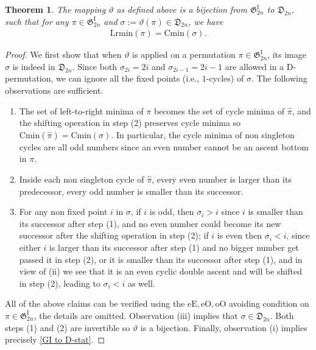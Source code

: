 \documentclass[11pt,reqno]{amsart}
\numberwithin{equation}{section}
\theoremstyle{plain}
\newtheorem{theorem}{Theorem}[section]
\theoremstyle{definition}
\newcommand{\fD}{\mathfrak{D}}
\newcommand{\fG}{\mathfrak{G}}
\newcommand{\GI}{\fG^{\mathrm{I}}}
\def\oO{\mathrm{oO}}
\def\eE{\mathrm{eE}}
\def\eO{\mathrm{eO}}
\def\Lrmin{\mathrm{Lrmin}}
\def\Cmin{\mathrm{Cmin}}
\begin{document}
\begin{theorem}\label{linyanbijection}
	The mapping $\vartheta$ as defined above is a bijection from $\GI_{2n}$ to $\fD_{2n}$, such that for any $\pi\in\GI_{2n}$ and $\sigma:=\vartheta(\pi)\in\fD_{2n}$, we have
	\begin{align}\label{GI to D-stat}
	\Lrmin(\pi) = \Cmin(\sigma).
	\end{align}  
\end{theorem}
\begin{proof}
We first show that when $\vartheta$ is applied on a permutation $\pi\in\GI_{2n}$, its image $\sigma$ is indeed in $\fD_{2n}$. Since both $\sigma_{2i}=2i$ and $\sigma_{2i-1}=2i-1$ are allowed in a D-permutation, we can ignore all the fixed points (i.e., $1$-cycles) of $\sigma$. The following observations are sufficient. 
\begin{enumerate}[label=(\roman*)]
	\item The set of left-to-right minima of $\pi$ becomes the set of cycle minima of $\hat{\pi}$, and the shifting operation in step (2) preserves cycle minima so $\Cmin(\hat{\pi})=\Cmin(\sigma)$. In particular, the cycle minima of non singleton cycles are all odd numbers since an even number cannot be an ascent bottom in $\pi$.
	\item Inside each non singleton cycle of $\hat{\pi}$, every even number is larger than its predecessor, every odd number is smaller than its successor.
	\item For any non fixed point $i$ in $\sigma$, if $i$ is odd, then $\sigma_i>i$ since $i$ is smaller than its successor after step (1), and no even number could become its new successor after the shifting operation in step (2); if $i$ is even then $\sigma_i<i$, since either $i$ is larger than its successor after step (1) and no bigger number get passed it in step (2), or it is smaller than its successor after step (1), and in view of (ii) we see that it is an even cyclic double ascent and will be shifted in step (2), leading to $\sigma_i<i$ as well.
\end{enumerate}
All of the above claims can be verified using the $\eE,\eO,\oO$ avoiding condition on $\pi\in\GI_{2n}$, the details are omitted. Observation (iii) implies that $\sigma\in\fD_{2n}$. Both steps (1) and (2) are invertible so $\vartheta$ is a bijection. Finally, observation (i) implies precisely \eqref{GI to D-stat}.
\end{proof}
\end{document}
